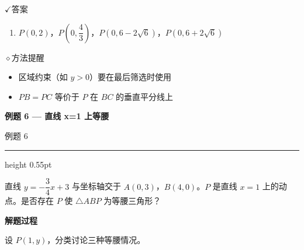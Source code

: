 \documentclass{exam-zh}
\newcommand{\eduSectionTitle}[1]{%
  \needspace{5\baselineskip}%
  \vspace{2mm}
  {\color{edu-blue}\bfseries\large #1}\par
  \vspace{3mm}
}
\newenvironment{eduSubQuestionItem}[1]{%
  \needspace{4\baselineskip}%
  \vspace{2mm}
  \par\noindent
  \hangindent=8mm\hangafter=1
  {\color{edu-blue}\bfseries #1}\enspace
  \begingroup
  \color{edu-ink}
}{%
  \endgroup
  \par
  \vspace{3mm}
}
\newcommand{\eduIconCheck}{\(\checkmark\)}
\newcommand{\eduIconPin}{\(\diamond\)}
\newenvironment{eduProblemBlock}[1][题目]{%
  \needspace{8\baselineskip}
  {\small\color{edu-muted}#1}\par
  \vspace{1.5mm}
  {\color{edu-blue}\hrule height 0.55pt}
  \vspace{4.5mm}
  \begingroup
  \color{edu-ink}
  \large
  \setlength{\parskip}{2.2mm}
  \linespread{1.20}\selectfont
}{%
  \par
  \endgroup
  \vspace{6mm}
}
\newenvironment{eduBulletList}{%
  \begin{itemize}[
    label=\textbullet,
    leftmargin=5mm,
    itemsep=1.2mm,
    topsep=0pt,
    parsep=0pt
  ]
}{%
  \end{itemize}
}
\newenvironment{eduBottomGrid}{%
  \vspace{1mm}
  \par\noindent
}{%
  \par\vspace{1mm}
}
\newenvironment{eduSummaryLeft}{%
  \begin{minipage}[t]{0.30\linewidth}
}{%
  \end{minipage}
}
\newcommand{\eduSummaryDivider}{%
  \hspace{4mm}{\color{edu-line}\vrule width 0.35pt}\hspace{7mm}%
}
\newenvironment{eduSummaryRight}{%
  \begin{minipage}[t]{0.58\linewidth}
}{%
  \end{minipage}
}
\newenvironment{eduPlainList}{%
  \begin{enumerate}[
    label=(\arabic*),
    leftmargin=7mm,
    itemsep=1.2mm,
    topsep=0pt,
    parsep=0pt
  ]
}{%
  \end{enumerate}
}
\begin{document}
\begin{eduBottomGrid}
  \begin{eduSummaryLeft}
    \begin{eduSummaryBlock}{\eduIconCheck}{答案}
    \begin{eduPlainList}
      \item $P(0,2)$，$P\left(0,\dfrac{4}{3}\right)$，$P(0,6-2\sqrt{6})$，$P(0,6+2\sqrt{6})$    \end{eduPlainList}
    \end{eduSummaryBlock}
  \end{eduSummaryLeft}
  \eduSummaryDivider
  \begin{eduSummaryRight}
    \begin{eduSummaryBlock}{\eduIconPin}{方法提醒}
    \begin{eduBulletList}
      \item 区域约束（如 $y>0$）要在最后筛选时使用      \item $PB=PC$ 等价于 $P$ 在 $BC$ 的垂直平分线上    \end{eduBulletList}
    \end{eduSummaryBlock}
  \end{eduSummaryRight}
\end{eduBottomGrid}



\eduSectionTitle{例题 6 — 直线 x=1 上等腰}

\begin{eduProblemBlock}[例题 6]
直线 $y=-\dfrac{3}{4}x+3$ 与坐标轴交于 $A(0,3)$，$B(4,0)$。$P$ 是直线 $x=1$ 上的动点。是否存在 $P$ 使 $\triangle ABP$ 为等腰三角形？
\end{eduProblemBlock}





\begin{eduSubQuestionItem}{解题过程}
设 $P(1,y)$，分类讨论三种等腰情况。\end{eduSubQuestionItem}
\end{document}
